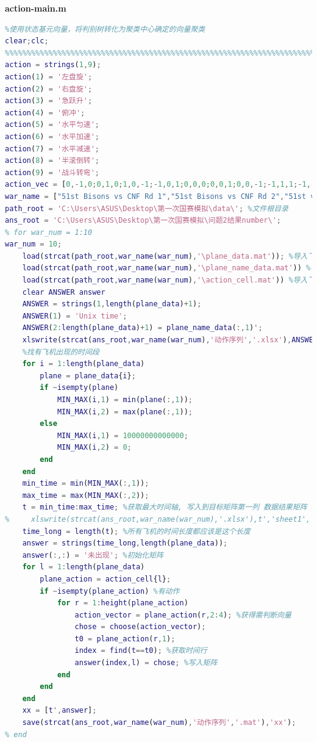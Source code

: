 \documentclass{my_paper}
\begin{document}
\textbf{action-main.m }
\begin{lstlisting}[language=matlab]
    %%%%%%%%%%%%%%%%%%%%%%%%%%%%%%%%%%%%%%%%%%%%%%%%%%%%%%%%%%%%%%%%%%%%%%%%%%%
%使用状态基元向量，将判别树转化为聚类中心确定的向量聚类
clear;clc;
%%%%%%%%%%%%%%%%%%%%%%%%%%%%%%%%%%%%%%%%%%%%%%%%%%%%%%%%%%%%%%%%%%%%%%%%%%%
action = strings(1,9);
action(1) = '左盘旋';
action(2) = '右盘旋';
action(3) = '急跃升';
action(4) = '俯冲';
action(5) = '水平匀速';
action(6) = '水平加速';
action(7) = '水平减速';
action(8) = '半滚倒转';
action(9) = '战斗转弯';
action_vec = [0,-1,0;0,1,0;1,0,-1;-1,0,1;0,0,0;0,0,1;0,0,-1;-1,1,1;-1,-1,1;1,1,-1;1,-1,-1]; %最后两个是叠加态判断
war_name = ["51st Bisons vs CNF Rd 1","51st Bisons vs CNF Rd 2","51st vs 36th R1","51st vs 36th R2","51st vs uvaf round 1","51st vs uvaf round 2","51st vs uvaf round 3","51stKIAP_vs_36th_Round_1","51stKIAP_vs_36th_Round_2","51stKIAP_vs_107th_Round_1"];
path_root = 'C:\Users\ASUS\Desktop\第一次国赛模拟\data\'; %文件根目录
ans_root = 'C:\Users\ASUS\Desktop\第一次国赛模拟\问题2结果number\';
% for war_num = 1:10
war_num = 10;
    load(strcat(path_root,war_name(war_num),'\plane_data.mat')); %导入飞机飞行信息  需要提取时间轴 
    load(strcat(path_root,war_name(war_num),'\plane_name_data.mat')) %导入飞机信息 飞机id在 1 
    load(strcat(path_root,war_name(war_num),'\action_cell.mat')) %导入飞机动作信息  时间 1 2 3 
    clear ANSWER answer
    ANSWER = strings(1,length(plane_data)+1);
    ANSWER(1) = 'Unix time';
    ANSWER(2:length(plane_data)+1) = plane_name_data(:,1)';
    xlswrite(strcat(ans_root,war_name(war_num),'动作序列','.xlsx'),ANSWER,'sheet1','A1'); %写入标题
    %找有飞机出现的时间段
    for i = 1:length(plane_data)
        plane = plane_data{i};
        if ~isempty(plane)
            MIN_MAX(i,1) = min(plane(:,1));
            MIN_MAX(i,2) = max(plane(:,1));
        else
            MIN_MAX(i,1) = 10000000000000;
            MIN_MAX(i,2) = 0;
        end
    end
    min_time = min(MIN_MAX(:,1));
    max_time = max(MIN_MAX(:,2));
    t = min_time:max_time; %获取最大时间轴, 写入到目标矩阵第一列 数据结果矩阵 和最终矩阵相差一行
%     xlswrite(strcat(ans_root,war_name(war_num),'.xlsx'),t','sheet1','A2'); %写入标题
    time_long = length(t); %所有飞机的时间长度都应该是这个长度
    answer = strings(time_long,length(plane_data));
    answer(:,:) = '未出现'; %初始化矩阵
    for l = 1:length(plane_data)
        plane_action = action_cell{l};
        if ~isempty(plane_action) %有动作
            for r = 1:height(plane_action)
                action_vector = plane_action(r,2:4); %获得需判断向量
                chose = choose(action_vector);
                t0 = plane_action(r,1);
                index = find(t==t0); %获取时间行
                answer(index,l) = chose; %写入矩阵
            end
        end
    end
    xx = [t',answer];
    save(strcat(ans_root,war_name(war_num),'动作序列','.mat'),'xx');
% end

\end{lstlisting}
\end{document}
